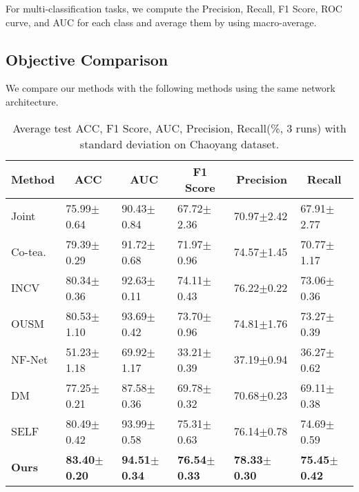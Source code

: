 For multi-classification tasks, we compute the {Precision}, Recall, F1 Score, {ROC} curve, and AUC for each class and average them by using macro-average.
\subsection{Objective Comparison}
We compare our methods with the following methods using the same network architecture.


\begin{table}[]
\scriptsize
\centering
\caption{{Average test ACC, F1 Score, AUC, {Precision}, Recall(\%, 3 runs) with standard deviation on Chaoyang dataset.}}
\label{table:objChaoyang}
\begin{tabular}{@{}llllll@{}}
\toprule
Method & \multicolumn{1}{c}{ACC} & \multicolumn{1}{c}{AUC} & \multicolumn{1}{c}{F1 Score} & \multicolumn{1}{c}{{Precision}} & \multicolumn{1}{c}{Recall} \\ \midrule
Joint      & 75.99$\pm$0.64          & 90.43$\pm$0.84          & 67.72$\pm$2.36               & 70.97$\pm$2.42          & 67.91$\pm$2.77             \\
Co-tea.      & 79.39$\pm$0.29          & 91.72$\pm$0.68          & 71.97$\pm$0.96               & 74.57$\pm$1.45          & 70.77$\pm$1.17             \\
INCV             & 80.34$\pm$0.36          & 92.63$\pm$0.11          & 74.11$\pm$0.43               & 76.22$\pm$0.22          & 73.06$\pm$0.36             \\
OUSM        & 80.53$\pm$1.10          & 93.69$\pm$0.42          & 73.70$\pm$0.96               & 74.81$\pm$1.76          & 73.27$\pm$0.39             \\
NF-Net           & 51.23$\pm$1.18          & 69.92$\pm$1.17          & 33.21$\pm$0.39               & 37.19$\pm$0.94          & 36.27$\pm$0.62             \\
DM        & 77.25$\pm$0.21          & 87.58$\pm$0.36          & 69.78$\pm$0.32               & 70.68$\pm$0.23          & 69.11$\pm$0.38             \\
SELF             & 80.49$\pm$0.42          & 93.99$\pm$0.58          & 75.31$\pm$0.63               & 76.14$\pm$0.78          & 74.69$\pm$0.59             \\
\textbf{Ours}    & \textbf{83.40$\pm$0.20} & \textbf{94.51$\pm$0.34} & \textbf{76.54$\pm$0.33}      & \textbf{78.33$\pm$0.30} & \textbf{75.45$\pm$0.42}    \\ \bottomrule
\end{tabular}
\end{table}

